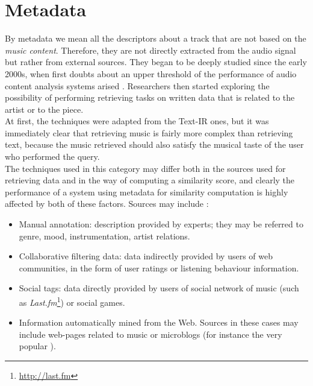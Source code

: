 \section{Metadata}
By metadata we mean all the descriptors about a track that are not based on the \textit{music content}. Therefore, they are not directly extracted from the audio signal but rather from external sources. They began to be deeply studied since the early 2000s, when first doubts about an upper threshold of the performance of audio content analysis systems arised \cite{aucou04}. Researchers then started exploring the possibility of performing retrieving tasks on written data that is related to the artist or to the piece. \\At first, the techniques were adapted from the Text-IR ones, but it was immediately clear that retrieving music is fairly more complex than retrieving text, because the music retrieved should also satisfy the musical taste of the user who performed the query. 
\\The techniques used in this category may differ both in the sources used for retrieving data and in the way of computing a similarity score, and clearly the performance of a system using metadata for similarity computation is highly affected by both of these factors. Sources may include \cite{bogdanov13}:
\begin{itemize}
\item Manual annotation: description provided by experts; they may be referred to genre, mood, instrumentation, artist relations.
\item Collaborative filtering data: data indirectly provided by users of web communities, in the form of user ratings or listening behaviour information.
\item Social tags: data directly provided by users of social network of music (such as \textit{Last.fm}\footnote{\url{http://last.fm}}) or social games.
\item Information automatically mined from the Web. Sources in these cases may include web-pages related to music or microblogs (for instance the very popular ).
\end{itemize}
